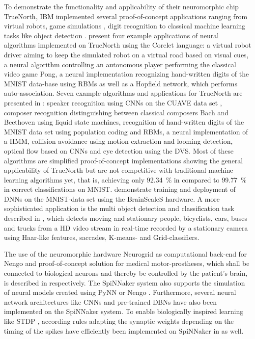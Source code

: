 To demonstrate the functionality and applicability of their neuromorphic chip TrueNorth, IBM implemented several proof-of-concept applications ranging from virtual robots, game simulations \parencite{Arthur2012}, digit recognition \parencite{Arthur2012, Esser2013} to classical machine learning tasks like object detection \parencite{Akopyan2015}.
\textcite{Arthur2012} present four example applications of neural algorithms implemented on TrueNorth using the Corelet language: a virtual robot driver aiming to keep the simulated robot on a virtual road based on visual cues, a neural algorithm controlling an autonomous player performing the classical video game Pong, a neural implementation recognizing hand-written digits of the \ac{MNIST} data-base using \acp{RBM} as well as a Hopfield network, which performs auto-association.
Seven example algorithms and applications for TrueNorth are presented in \textcite{Esser2013}: speaker recognition using \acp{CNN} on the \ac{CUAVE} data set \parencite{Patterson2002}, composer recognition distinguishing between classical composers Bach and Beethoven using liquid state machines, recognition of hand-written digits of the \ac{MNIST} data set using population coding and \acp{RBM}, a neural implementation of a \ac{HMM}, collision avoidance using motion extraction and looming detection, optical flow based on \acp{CNN} and eye detection using the \ac{DVS}.
Most of these algorithms are simplified proof-of-concept implementations showing the general applicability of TrueNorth but are not competitive with traditional machine learning algorithms yet, that is, achieving only \SI{92.34}{\percent} in \textcite{Esser2013} compared to \SI{99.77}{\percent} in \textcite{Ciresan2012a} correct classifications on \ac{MNIST}.
\textcite{Schmitt2017} demonstrate training and deployment of \acp{DNN} on the \ac{MNIST}-data set using the \ac{BrainScaleS} hardware.
A more sophisticated application is the multi object detection and classification task described in \textcite{Akopyan2015}, which detects moving and stationary people, bicyclists, cars, buses and trucks from a HD video stream in real-time recorded by a stationary camera using Haar-like features, saccades, K-means- and Grid-classifiers.

The use of the neuromorphic hardware Neurogrid \parencite{Benjamin2014} as computational back-end for \ac{Nengo} and proof-of-concept solution for medical motor-prostheses, which shall be connected to biological neurons and thereby be controlled by the patient's brain, is described in \textcite{Choudhary2012, Dethier2011} respectively.
The \ac{SpiNNaker} system \parencite{Furber2014} also supports the simulation of neural models created using \ac{PyNN} or \ac{Nengo} \parencite{Mundy2015}.
Furthermore, several neural network architectures like \acp{CNN} \parencite{Serrano-Gotarredona2015} and pre-trained \acp{DBN} \parencite{Stromatias2015a, Stromatias2015} have also been implemented on the \ac{SpiNNaker} system.
To enable biologically inspired learning like \ac{STDP} \parencite{Bi2001}, according rules adapting the synaptic weights depending on the timing of the spikes have efficiently been implemented on \ac{SpiNNaker} in \textcite{Diehl2014} as well.

